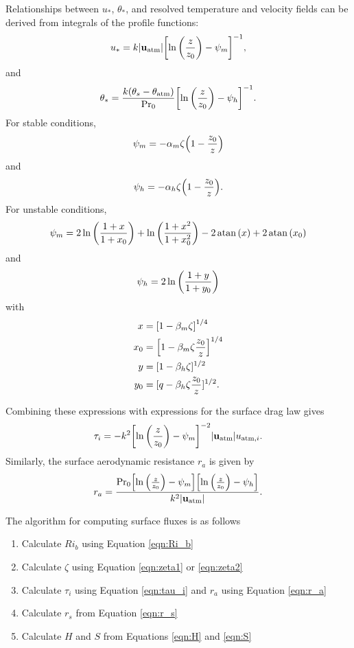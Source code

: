 \documentclass[10pt]{article}
\begin{document}
Relationships between $u_*$, $\theta_*$, and resolved temperature and velocity fields can be derived from integrals of the profile functions:
\begin{equation*}
u_* =k |{\bf u}_{\mathrm{atm}}| \qty[\ln \qty(\frac{z}{z_0}) - \psi_m]^{-1},
\end{equation*}
and
\begin{equation*}
\theta_* = \frac{k \qty(\theta_{s} - \theta_{\mathrm{atm}})}{\mathrm{Pr}_0} \qty[\ln \qty(\frac{z}{z_0}) - \psi_h]^{-1}.
\end{equation*}
For stable conditions,
\begin{equation*}
\psi_m = -\alpha_m \zeta \qty(1 - \frac{z_0}{z})
\end{equation*}
and
\begin{equation*}
\psi_h = -\alpha_h \zeta \qty(1 - \frac{z_0}{z}).
\end{equation*}
For unstable conditions,
\begin{equation*}
\psi_m = 2 \ln \qty(\frac{1 + x}{1 + x_0}) + \ln \qty(\frac{1 + x^2}{1 + x_0^2}) - 2 \atan \qty(x) + 2 \atan \qty (x_0)
\end{equation*}
and
\begin{equation*}
\psi_h = 2 \ln \qty (\frac{1 + y}{1 + y_0})
\end{equation*}
with
\begin{align*}
x &= \qty[1 - \beta_m \zeta]^{1/4} \\
x_0 &= \qty[1 - \beta_m \zeta \frac{z_0}{z}]^{1/4} \\
y &= [1 - \beta_h \zeta]^{1/2} \\
y_0 &= [q - \beta_h \zeta \frac{z_0}{z}]^{1/2}.
\end{align*}

Combining these expressions with expressions for the surface drag law gives
\begin{equation} \label{eqn:tau_i}
\tau_i = -k^2 \qty[\ln\qty(\frac{z}{z_0}) - \psi_m]^{-2} |{\bf u}_{\mathrm{atm}}| u_{\mathrm{atm},i}.
\end{equation}
Similarly, the surface aerodynamic resistance $r_a$ is given by
\begin{equation} \label{eqn:r_a}
r_a = \frac{\mathrm{Pr}_0 \qty[\ln \qty(\frac{z}{z_0}) - \psi_m] \qty[\ln \qty(\frac{z}{z_0}) - \psi_h]}{k^2 |{\bf u}_{\mathrm{atm}}|}.
\end{equation}

The algorithm for computing surface fluxes is as follows
\begin{enumerate}
\item Calculate $Ri_b$ using Equation \ref{eqn:Ri_b}
\item Calculate $\zeta$ using Equation \ref{eqn:zeta1} or \ref{eqn:zeta2}
\item Calculate $\tau_i$ using Equation \ref{eqn:tau_i} and $r_a$ using Equation \ref{eqn:r_a}
\item Calculate $r_s$ from Equation \ref{eqn:r_s}
\item Calculate $H$ and $S$ from Equations \ref{eqn:H} and \ref{eqn:S}
\end{enumerate}
\end{document}
